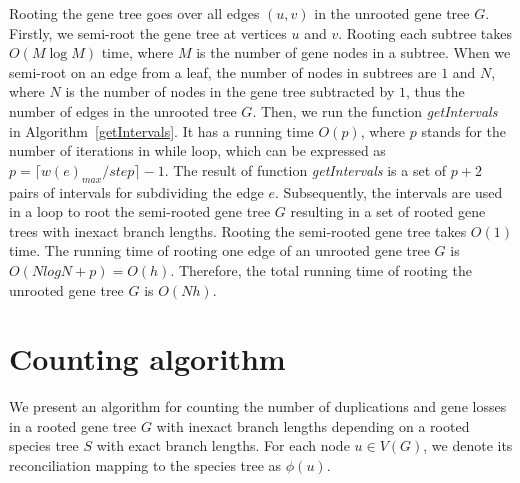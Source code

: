 Rooting the gene tree goes over all edges $(u, v)$ in the unrooted gene tree $G$. Firstly, we semi-root the gene tree at vertices $u$ and $v$. Rooting each subtree takes $O(M \log M)$ time, where $M$ is the number of gene nodes in a subtree. When we semi-root on an edge from a leaf, the number of nodes in subtrees are $1$ and $N$, where $N$ is the number of nodes in the gene tree subtracted by $1$, thus the number of edges in the unrooted tree $G$. Then, we run the function \emph{getIntervals} in Algorithm~\ref{getIntervals}. It has a running time $O(p)$, where $p$ stands for the number of iterations in while loop, which can be expressed as $p = \lceil w(e)_{max}/step\rceil - 1$. The result of function \emph{getIntervals} is a set of $p+2$ pairs of intervals for subdividing the edge $e$. Subsequently, the intervals are used in a loop to root the semi-rooted gene tree $G$ resulting in a set of rooted gene trees with inexact branch lengths. Rooting the semi-rooted gene tree takes $O(1)$ time. The running time of rooting one edge of an unrooted gene tree $G$ is $O(N log N + p) = O(h)$. Therefore, the total running time of rooting the unrooted gene tree $G$ is $O(Nh)$.


\section{Counting algorithm} \label{counting_algorithm}

We present an algorithm for counting the number of duplications and gene losses in a rooted gene tree $G$ with inexact branch lengths depending on a rooted species tree $S$ with exact branch lengths. For each node $u \in V(G)$, we denote its reconciliation mapping to the species tree as $\phi(u)$.

